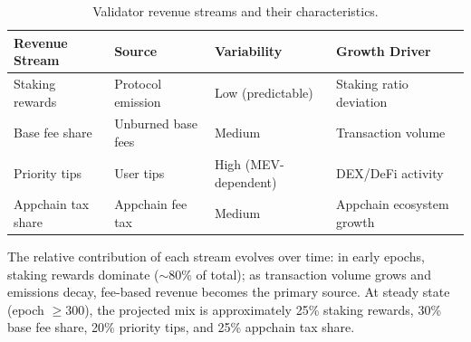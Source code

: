 \begin{table}[H]
\centering
\caption{Validator revenue streams and their characteristics.}
\label{tab:revenuestreams}
\begin{tabular}{p{3cm}p{2.5cm}p{2.5cm}p{3cm}}
\toprule
\textbf{Revenue Stream} & \textbf{Source} & \textbf{Variability} & \textbf{Growth Driver} \\
\midrule
Staking rewards & Protocol emission & Low (predictable) & Staking ratio deviation \\
Base fee share & Unburned base fees & Medium & Transaction volume \\
Priority tips & User tips & High (MEV-dependent) & DEX/DeFi activity \\
Appchain tax share & Appchain fee tax & Medium & Appchain ecosystem growth \\
\bottomrule
\end{tabular}
\end{table}

The relative contribution of each stream evolves over time: in early epochs, staking rewards dominate ($\sim$80\% of total); as transaction volume grows and emissions decay, fee-based revenue becomes the primary source. At steady state (epoch $\geq 300$), the projected mix is approximately 25\% staking rewards, 30\% base fee share, 20\% priority tips, and 25\% appchain tax share.

